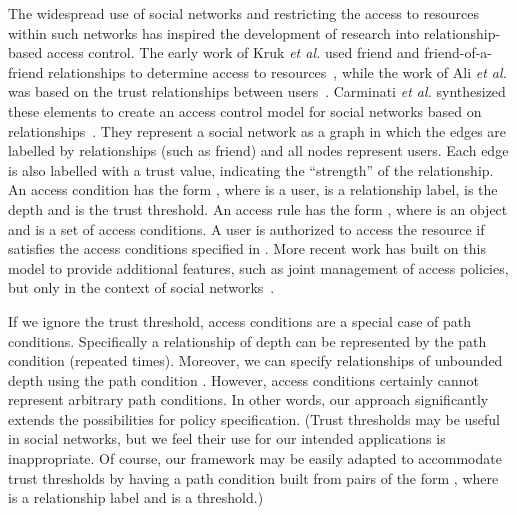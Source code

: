 \documentclass{article}
\begin{document}
The widespread use of social networks and restricting the access to resources within such networks has inspired the development of research into relationship-based access control.
The early work of Kruk {\em et al.} used {\sf friend} and {\sf friend-of-a-friend} relationships to determine access to resources~\cite{KrGrGzWoCh06}, while the work of Ali {\em et al.} was based on the trust relationships between users~\cite{AlViMa07}.
Carminati {\em et al.} synthesized these elements to create an access control model for social networks based on relationships~\cite{Carminati_Enforcing}.
They represent a social network as a graph in which the edges are labelled by relationships (such as {\sf friend}) and all nodes represent users.
Each edge is also labelled with a trust value, indicating the ``strength'' of the relationship.
An access condition has the form , where  is a user,  is a relationship label,  is the depth and  is the trust threshold.
An access rule has the form , where  is an object and  is a set of access conditions.
A user  is authorized to access the resource  if  satisfies the access conditions specified in .
More recent work has built on this model to provide additional features, such as joint management of access policies, but only in the context of social networks~\cite{HuAhJo13}.

If we ignore the trust threshold, access conditions are a special case of path conditions.
Specifically a relationship  of depth  can be represented by the path condition  (repeated  times).
Moreover, we can specify relationships of unbounded depth using the path condition .
However, access conditions certainly cannot represent arbitrary path conditions.
In other words, our approach significantly extends the possibilities for policy specification.
(Trust thresholds may be useful in social networks, but we feel their use for our intended applications is inappropriate.
Of course, our framework may be easily adapted to accommodate trust thresholds by having a path condition built from pairs of the form , where  is a relationship label and  is a threshold.)
\end{document}
